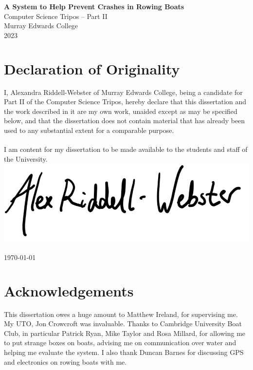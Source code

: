 \documentclass[12pt,a4paper]{report}
\begin{document}
\thispagestyle{empty}


\vspace*{60mm}
\begin{center}
\Huge
\textbf{A System to Help Prevent Crashes in Rowing Boats} \\[5mm]
Computer Science Tripos -- Part II \\[5mm]
Murray Edwards College \\[5mm]
2023
\end{center}

\pagestyle{plain}
\chapter*{Declaration of Originality}

I, Alexandra Riddell-Webster of Murray Edwards College, being a candidate for Part II of the Computer Science Tripos, hereby declare that this dissertation and the work described in it are my own work, unaided except as may be specified below, and that the dissertation does not contain material that has already been used to any substantial extent for a comparable purpose. \\ \\
I am content for my dissertation to be made available to the students and staff of the University. \\

\bigskip
{}
\includegraphics[scale=0.4]{sig.jpg} \\
 \\ 
\today

\chapter*{Acknowledgements}
This dissertation owes a huge amount to Matthew Ireland, for supervising me. My UTO, Jon Crowcroft was invaluable. Thanks to Cambridge University Boat Club, in particular Patrick Ryan, Mike Taylor and Rosa Millard, for allowing me to put strange boxes on boats, advising me on communication over water and helping me evaluate the system. I also thank Duncan Barnes for discussing GPS and electronics on rowing boats with me.
\end{document}
